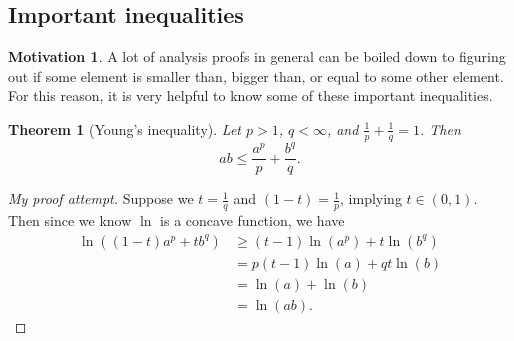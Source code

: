 \documentclass[11pt]{article}
\newtheorem{theorem}{Theorem}
\theoremstyle{definition}
\newtheorem*{motivation}{Motivation}
\begin{document}
\subsection{Important inequalities}
\begin{motivation}
A lot of analysis proofs in general can be boiled down to figuring out if some element is smaller than, bigger than, or equal to some other element.
For this reason, it is very helpful to know some of these important inequalities. 
\end{motivation}
\begin{theorem}[Young's inequality]
Let $p > 1$, $q < \infty$, and $\frac{1}{p}+\frac{1}{q} = 1$. Then
\[ab \leq \frac{a^p}{p} + \frac{b^q}{q}.\]
\end{theorem}
\begin{proof}[My proof attempt]
Suppose we $t = \frac{1}{q}$ and $(1-t)=\frac{1}{p}$, implying $t \in (0,1)$. Then since we know $\ln$ is a concave function, we have
	\begin{equation*}
		\begin{aligned}
			\ln{((1-t)a^p + tb^q)} &\geq (t-1)\ln{(a^p)} + t\ln{(b^q)} \\
					       &= p(t-1)\ln{(a)} + qt\ln{(b)} \\
					       &= \ln{(a)} + \ln{(b)} \\
					       &= \ln{(ab)}.
		\end{aligned}
	\end{equation*}
\end{proof}
\end{document}
